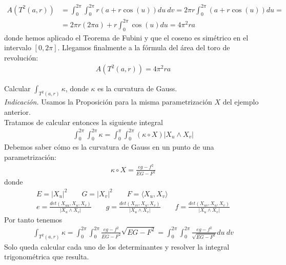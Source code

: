 \begin{ejemplo}
\begin{solucion}
        \begin{align*}
            A(T^2(a,r)) &= 
            \int_0^{2\pi} \int_0^{2\pi} r(a+r\cos(u)) du\ dv = 
            2\pi r \int_0^{2\pi} (a+ r\cos(u)) du = \\
            &=
            2\pi r(2\pi a) + r \int_0^{2\pi} \cos(u) du = 4\pi^2 r a
        \end{align*}
        donde hemos aplicado el Teorema de Fubini y que el coseno es simétrico en el intervalo $[0,2\pi]$. Llegamos finalmente a la fórmula del área del toro de revolución: 
        \begin{gather*}
            \boxed{A(T^2(a,r)) = 4\pi^2 ra}
        \end{gather*}
    \end{solucion}
\end{ejemplo}

\begin{ejemplo}
    Calcular $\displaystyle\int_{T^2(a,r)} \kappa$, donde $\kappa$ es la curvatura de Gauss.\\

    \textit{Indicación.} Usamos la Proposición para la misma parametrización $X$ del ejemplo anterior. \\

    Tratamos de calcular entonces la siguiente integral
    \begin{gather*}
        \int_0^{2\pi} \int_0^{2\pi} \kappa = \int_0^{\pi} \int_0^{2\pi} (\kappa\circ X) |X_u\wedge X_v|
    \end{gather*}
    Debemos saber cómo es la curvatura de Gauss en un punto de una parametrización:
    \begin{gather*}
        \kappa \circ X = \frac{eg - f^2}{EG - F^2}
    \end{gather*}
    donde
    \begin{gather*}
        E = |X_u|^2 \qquad G=|X_v|^2 \qquad F = \langle X_u, X_v \rangle\\[1em]
        e = \frac{det(X_{uu}, X_u, X_v)}{|X_u \wedge X_v|} \qquad 
        g = \frac{det(X_{vv}, X_u, X_v)}{|X_u \wedge X_v|} \qquad
        f = \frac{det(X_{uv}, X_u, X_v)}{|X_u \wedge X_v|}
    \end{gather*}
    Por tanto tenemos
    \begin{gather*}
        \int_{T^2(a,r)} \kappa = \int_0^{2\pi} \int_0^{2\pi} \frac{eg - f^2}{EG - F^2} \sqrt{EG - F^2} = \int_0^{2\pi}\int_0^{2\pi} \frac{eg - f^2}{\sqrt{EG - F^2}} du\ dv
    \end{gather*}
    Solo queda calcular cada uno de los determinantes y resolver la integral trigonométrica que resulta.
\end{ejemplo}

